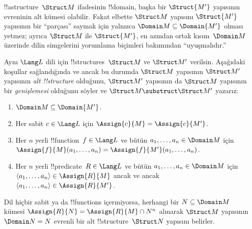 \documentclass[../../../include/open-logic-section]{subfiles}
\begin{document}

!!a{structure}~$\Struct M$ ifadesinin !!{domain}, başka bir
$\Struct{M'}$ yapısının evreninin alt kümesi olabilir. Fakat elbette
$\Struct M$ yapısını $\Struct{M'}$ yapısının bir ``parçası'' saymak
için yalnızca $\Domain M\subseteq\Domain{M'}$ olması yetmez; ayrıca
$\Struct M$ ile $\Struct{M'}$, en azından ortak kısım~$\Domain M$
üzerinde dilin simgelerini yorumlama biçimleri bakımından
``uyuşmalıdır.''

\begin{defn}
Aynı $\Lang L$ dili için !!{structure}s~$\Struct M$ ve $\Struct M'$
verilsin. Aşağıdaki koşullar sağlandığında ve ancak bu durumda
$\Struct M$ yapısının $\Struct M'$ yapısının \emph{alt !!{structure}}
olduğunu, $\Struct M'$ yapısının da $\Struct M$ yapısının bir
\emph{genişlemesi} olduğunu söyler ve $\Struct M\substruct\Struct M'$
yazarız:
\begin{enumerate}
\item $\Domain M\subseteq\Domain{M'}$.
\item Her sabit $c\in\Lang L$ için
  $\Assign{c}{M}=\Assign{c}{M'}$.
\item Her $n$ yerli !!{function}~$f\in\Lang L$ ve bütün
  $a_1,\dots,a_n\in\Domain M$ için
  $\Assign{f}{M}(a_1,\dots,a_n)=\Assign{f}{M'}(a_1,\dots,a_n)$.
\item Her $n$ yerli !!{predicate}~$R\in\Lang L$ ve bütün
  $a_1,\dots,a_n\in\Domain M$ için
  $\langle a_1,\dots,a_n\rangle\in\Assign{R}{M}$ ancak ve ancak
  $\langle a_1,\dots,a_n\rangle\in\Assign{R}{M'}$.
\end{enumerate}
\end{defn}

\begin{rem}
Dil hiçbir sabit ya da !!{function}s içermiyorsa, herhangi bir
$N\subseteq\Domain M$ kümesi $\Assign{R}{N}=\Assign{R}{M}\cap N^n$
alınarak $\Struct M$ yapısının $\Domain N=N$ evrenli bir alt
!!{structure}~$\Struct N$ yapısını belirler.
\end{rem}

\end{document}
